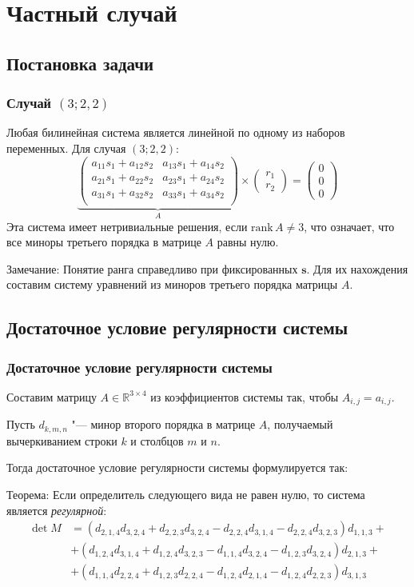 \documentclass[russian,hyperref={unicode}]{beamer}
\begin{document}
\section{Частный случай}
\subsection{Постановка задачи}
\frame
{
	\frametitle{Случай $(3; 2, 2)$}
	Любая билинейная система является линейной по одному из наборов переменных. Для случая 	
	$(3;2, 2)$:
	$$
		\underbrace{
		\begin{pmatrix}
			a_{1 1} s_1 + a_{1 2} s_2 & a_{1 3} s_1 + a_{1 4} s_2 \\
			a_{2 1} s_1 + a_{2 2} s_2 & a_{2 3} s_1 + a_{2 4} s_2 \\
			a_{3 1} s_1 + a_{3 2} s_2 & a_{3 3} s_1 + a_{3 4} s_2 \\
		\end{pmatrix}}_{A}
		\times
		\begin{pmatrix}
			r_1 \\
			r_2
		\end{pmatrix}=
		\begin{pmatrix}
			0 \\
			0 \\
			0
		\end{pmatrix}
	$$
	Эта система имеет нетривиальные решения, если $\text{rank}\,A 
	\ne 3$, что означает, что все миноры третьего порядка в матрице $A$ равны нулю.
	\begin{alertblock}{Замечание:}
		Понятие ранга справедливо при фиксированных $\mathbf{s}$. Для их нахождения составим 
		систему уравнений из миноров третьего порядка матрицы $A$.
	\end{alertblock}
}
\subsection{Достаточное условие регулярности системы}
\frame
{
	\frametitle{Достаточное условие регулярности системы}
	Составим матрицу $A \in \mathbb{R}^{3 \times 4}$ из коэффициентов системы так, чтобы 
	$A_{i,j} = a_{i,j}$. 
	
	Пусть $d_{k, m, n}$ "--- минор второго порядка в матрице $A$, получаемый вычеркиванием строки $k$ 
	и столбцов $m$ и $n$.
	
	Тогда достаточное условие регулярности системы формулируется так: 
	\begin{block}{Теорема:}
		Если определитель следующего вида не равен нулю, то система является 
		\textit{регулярной}:
		\begin{align*}
		 	\det M & = (d_{2,1,4} d_{3,2,4} + d_{2,2,3} d_{3,2,4} - d_{2,2,4} d_{3,1,4} - 
		 	d_{2,2,4} d_{3,2,3}) d_{1,1,3} + \\
		 	& + (d_{1,2,4} d_{3,1,4} + d_{1,2,4} d_{3,2,3} - d_{1,1,4} d_{3,2,4} - d_{1,2,3}
		 	d_{3,2,4}) d_{2,1,3} + \\		 
		 	& + (d_{1,1,4} d_{2,2,4} + d_{1,2,3}d_{2,2,4} - d_{1,2,4}d_{2,1,4} - d_{1,2,4}
		 	d_{2,2,3}) d_{3,1,3}
		\end{align*} 
	\end{block}
}
\end{document}
